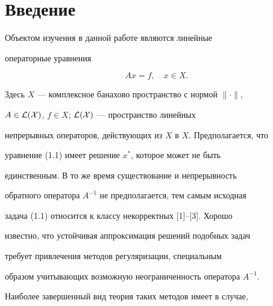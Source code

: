  


\date{} 




\pagestyle{plain} %


 




\maketitle 


\label{begin} 


 


\section{Введение} 


 


Объектом изучения в данной работе являются линейные 


операторные уравнения 


\begin{equation} 


A x=f,\quad x\in X. 


\end{equation} 


Здесь $X$ --- комплексное банахово пространство с нормой $\|\cdot\|$, 


$A\in\cal L(X)$, $f\in X$; $\cal L(X)$ --- пространство линейных 


непрерывных операторов, действующих из $X$ в $X$. Предполагается, что 


уравнение (1.1) имеет решение $x^*$, которое может не быть 


единственным. В то же время существование и непрерывность 


обратного оператора $A^{-1}$ не предполагается, тем самым исходная 


задача (1.1) относится к классу некорректных [1]--[3]. Хорошо 


известно, что устойчивая аппроксимация решений подобных задач 


требует привлечения методов регуляризации, специальным 


образом учитывающих возможную неограниченность оператора $A^{-1}$. 


Наиболее завершенный вид теория таких методов имеет в случае, 


